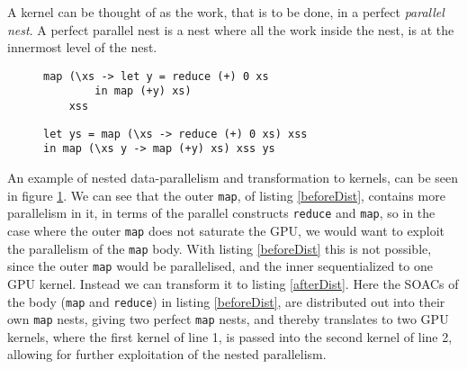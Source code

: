 A kernel can be thought of as the work, that is to be done, in a perfect \textit{parallel nest}. A perfect parallel nest is a nest where all the work inside the nest, is at the innermost level of the nest. 
\begin{figure}
\centering
	\begin{minipage}{0.45\textwidth}
	\centering
	\begin{lstlisting}
map (\xs -> let y = reduce (+) 0 xs 
		in map (+y) xs)
	xss
	\end{lstlisting}
	 \label{beforeDist}
	\end{minipage}\hspace*{\fill}
	\begin{minipage}{0.45\textwidth}
	\centering
	\begin{lstlisting}
let ys = map (\xs -> reduce (+) 0 xs) xss
in map (\xs y -> map (+y) xs) xss ys
	\end{lstlisting}
	 \label{afterDist}
	\end{minipage}
	\label{loopDist}
\end{figure}
\noindent An example of nested data-parallelism and transformation to kernels, can be seen in figure \ref{loopDist}. We can see that the outer \texttt{map}, of listing \ref{beforeDist}, contains more parallelism in it, in terms of the parallel constructs \texttt{reduce} and \texttt{map}, so in the case where the outer \texttt{map} does not saturate the GPU, we would want to exploit the parallelism of the \texttt{map} body. With listing \ref{beforeDist} this is not possible, since the outer \texttt{map} would be parallelised, and the inner sequentialized to one GPU kernel. Instead we can transform it to listing \ref{afterDist}. Here the SOACs of the body (\texttt{map} and \texttt{reduce}) in listing \ref{beforeDist}, are distributed out into their own \texttt{map} nests, giving two perfect \texttt{map} nests, and thereby translates to two GPU kernels, where the first kernel of line 1, is passed into the second kernel of line 2, allowing for further exploitation of the nested parallelism.

